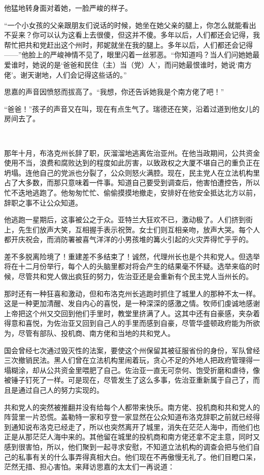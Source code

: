 \par 他猛地转身面对着她，一脸严峻的样子。
\par “一个小女孩的父亲跟朋友们说话的时候，她坐在她父亲的腿上，你怎么就能看出不妥来？你可以认为这看上去很傻，但这并不傻。多年以后，人们都还会记得，我帮忙把共和党赶出这个州时，邦妮就坐在我的腿上。多年以后，人们都还会记得——”他脸上的严峻神情不见了，眼里闪着一丝邪恶。“你知道吗？当人们问她她最爱谁时，她说的是‘爸爸和民住（主）当（党）人’，而问她最恨谁时，她说‘南方佬’。谢天谢地，人们会记得这些话的。”
\par 思嘉的声音因愤怒而拔高了。“我想，你还告诉她我是个南方佬了吧！”
\par “爸爸！”孩子的声音又在叫，现在有点生气了。瑞德还在笑，沿着过道到他女儿的房间去了。
\par  
\par 那年十月，布洛克州长辞了职，灰溜溜地逃离佐治亚州。在他当政期间，公共资金使用不当，浪费和腐败达到的程度如此厉害，以致政权之大厦不堪自己的重负正在坍塌。连他自己的党派也分裂了，公众则怒火满腔。现在，民主党人在立法机构里占了大多数，而那只意味着一件事。知道自己要受到调查后，他害怕遭控告，所以忙不迭地逃跑了。他匆匆忙忙、偷偷摸摸地撤走，安排好在他安全抵达北方以前，辞职之事不让公众知道。
\par 他逃跑一星期后，这事被公之于众。亚特兰大狂欢不已，激动极了。人们挤到街上，先生们放声大笑，互相握手表示祝贺。女士们则互相亲吻，放声大哭。每个人都开庆祝会，而消防署被喜气洋洋的小男孩堆的篝火引起的火灾弄得忙乎乎的。
\par 差不多脱离险境了！重建差不多结束了！诚然，代理州长也是个共和党人。但选举将在十二月份举行，每个人的头脑里都对将会产生的结果毫不怀疑。选举来临的时候，尽管共和党人做出疯狂的努力，佐治亚还是会重新有个民主党人当州长的。
\par 那时还有一种狂喜和激动，但和布洛克州长逃跑时抓住了城里人的那种不太一样。这是一种更加清醒、发自内心的喜悦，是一种深深的感激之情。牧师们虔诚地感谢上帝把这个州又交回到他们手里时，教堂里挤满了人。这其中还有自豪感，夹杂着得意和喜悦，为佐治亚又回到自己人的手里而感到自豪，尽管华盛顿政府能为所欲为，尽管有部队、投机商、南方佬和当地的共和党人。
\par 国会曾经七次通过毁灭性的法案，要使这个州保留其被征服省份的身份，军队曾经三次撤销民法。黑人们曾在立法机构里闹着玩，贪心不足的外地人把政府管理得一塌糊涂，却从公共资金里喂肥了自己。佐治亚一直无可奈何、饱受折磨和虐待，像被锤子钉死了一样。可是现在，尽管发生了这么多事，佐治亚重新属于自己了，而且是通过自己人的努力实现的。
\par 共和党人的突然被推翻并没有给每个人都带来快乐。南方佬、投机商和共和党人的阵营里一片恐慌。盖勒特一家和亨登一家显然在公众知道布洛克辞职之前就已经得到通知说布洛克已经走了，所以也突然离开了城里，消失在茫茫人海中，而他们也正是从那茫茫人海中来的。其他留在城里的投机商和南方佬还拿不定主意，同时又感到很害怕，所以，他们聚到一起寻求安慰，不知道立法机构的调查会把与他们自己的私事有关的什么事弄得真相大白。他们现在不再傲慢无礼了。他们目瞪口呆，茫然无措、担心害怕。来拜访思嘉的太太们一再说道：
